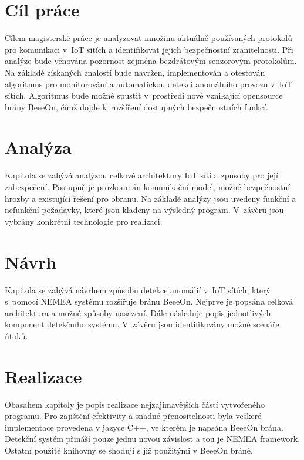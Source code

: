 \documentclass[thesis=M,czech]{FITthesis}[2012/06/26]
\begin{document}
\chapter{Cíl práce}
Cílem magisterské práce je analyzovat množinu aktuálně používaných protokolů
pro komunikaci v~IoT sítích a identifikovat jejich bezpečnostní zranitelnosti.
Při analýze bude věnována pozornost zejména bezdrátovým senzorovým protokolům.
Na základě získaných znalostí bude navržen, implementován a otestován algoritmus
pro monitorování a automatickou detekci anomálního provozu v~IoT sítích.
Algoritmus bude možné spustit
v~prostředí nově vznikající opensource brány BeeeOn, čímž dojde k~rozšíření 
dostupných bezpečnostních funkcí.


\chapter{Analýza}
Kapitola se zabývá analýzou celkové architektury IoT sítí a způsoby pro její
zabezpečení. Postupně je prozkoumán komunikační model, možné bezpečnostní hrozby 
a existující řešení pro obranu. Na základě analýzy jsou uvedeny funkční a nefunkční
požadavky, které jsou kladeny na výsledný program. V~závěru jsou vybrány konkrétní
technologie pro realizaci.

 


\chapter{Návrh}
Kapitola se zabývá návrhem způsobu detekce anomálií v~IoT sítích, který s~pomocí NEMEA
systému rozšiřuje bránu BeeeOn. Nejprve je popsána celková architektura a
možné způsoby nasazení. Dále následuje popis jednotlivých komponent detekčního systému.
V~závěru jsou identifikovány možné scénáře útoků.

 

\chapter{Realizace}
Obasahem kapitoly je popis realizace nejzajímavějších částí vytvořeného programu. Pro zajištění
efektivity a snadné přenositelnosti byla veškeré implementace provedena v jazyce C++, ve kterém
je napsána BeeeOn brána. Detekční systém přináší pouze jednu novou závislost a tou je NEMEA framework.
Ostatní použité knihovny se shodují s již použitými v BeeeOn bráně.

 
\end{document}
